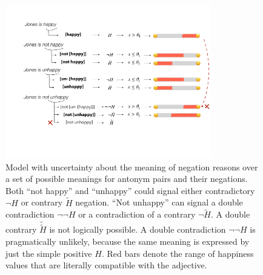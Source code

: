\documentclass[floatsintext,doc]{apa6}
\begin{document}
%



\begin{figure}[t]
\centering \includegraphics[width=0.8\textwidth]{figs/schematicMeanings}  
\caption{Model with uncertainty about the meaning of negation reasons over a set of possible meanings for antonym pairs and their negations.
Both ``not happy'' and ``unhappy'' could signal either contradictory $\neg H$ or contrary $\tilde{H}$ negation.
``Not unhappy'' can signal a double contradiction  $\neg \neg H$  or a contradiction of a contrary  $ \neg \tilde{H}$. A double contrary $\tilde{\tilde{H}}$ is not logically possible. A double contradiction  $\neg \neg H$  is pragmatically unlikely, because the same meaning is expressed by just the simple positive $H$. Red bars denote the range of happiness values that are literally compatible with the adjective.}
\label{fig:meanings}
\end{figure}
\end{document}
